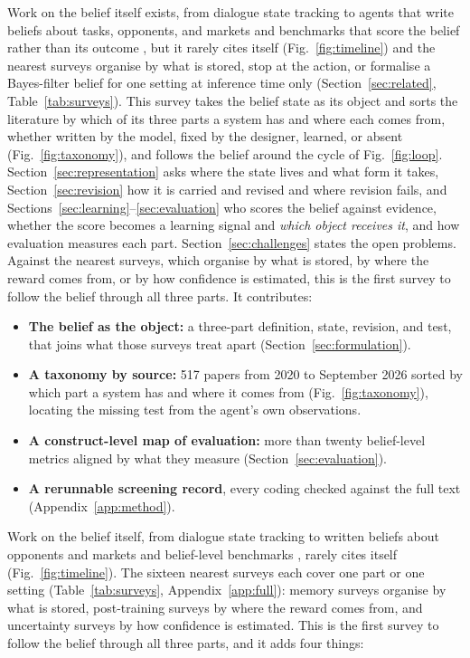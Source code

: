 \ifnature Work on the belief itself exists, from dialogue state tracking \citep{lee2021dialogue} to agents that write beliefs about tasks, opponents, and markets \citep{kim2024qube,cross2024hypothetical,yu2024fincon} and benchmarks that score the belief rather than its outcome \citep{xu2026should,deb2026stocktake,chao2026stale}, but it rarely cites itself (Fig.~\ref{fig:timeline}) and the nearest surveys organise by what is stored, stop at the action, or formalise a Bayes-filter belief for one setting at inference time only (Section~\ref{sec:related}, Table~\ref{tab:surveys}). This survey takes the belief state as its object and sorts the literature by which of its three parts a system has and where each comes from, whether written by the model, fixed by the designer, learned, or absent (Fig.~\ref{fig:taxonomy}), and follows the belief around the cycle of Fig.~\ref{fig:loop}. Section~\ref{sec:representation} asks where the state lives and what form it takes, Section~\ref{sec:revision} how it is carried and revised and where revision fails, and Sections~\ref{sec:learning}--\ref{sec:evaluation} who scores the belief against evidence, whether the score becomes a learning signal and \emph{which object receives it}, and how evaluation measures each part. Section~\ref{sec:challenges} states the open problems. Against the nearest surveys, which organise by what is stored, by where the reward comes from, or by how confidence is estimated, this is the first survey to follow the belief through all three parts. It contributes:
\begin{itemize}[leftmargin=*,nosep,topsep=2pt]
\item \textbf{The belief as the object:} a three-part definition, state, revision, and test, that joins what those surveys treat apart (Section~\ref{sec:formulation}).
\item \textbf{A taxonomy by source:} 517 papers from 2020 to September 2026 sorted by which part a system has and where it comes from (Fig.~\ref{fig:taxonomy}), locating the missing test from the agent's own observations.
\item \textbf{A construct-level map of evaluation:} more than twenty belief-level metrics aligned by what they measure (Section~\ref{sec:evaluation}).
\item \textbf{A rerunnable screening record}, every coding checked against the full text (Appendix~\ref{app:method}).
\end{itemize}\else Work on the belief itself, from dialogue state tracking \citep{lee2021dialogue} to written beliefs about opponents and markets \citep{cross2024hypothetical,yu2024fincon} and belief-level benchmarks \citep{xu2026should,deb2026stocktake}, rarely cites itself (Fig.~\ref{fig:timeline}). The sixteen nearest surveys each cover one part or one setting (Table~\ref{tab:surveys}, Appendix~\ref{app:full}): memory surveys organise by what is stored, post-training surveys by where the reward comes from, and uncertainty surveys by how confidence is estimated. This is the first survey to follow the belief through all three parts, and it adds four things:
